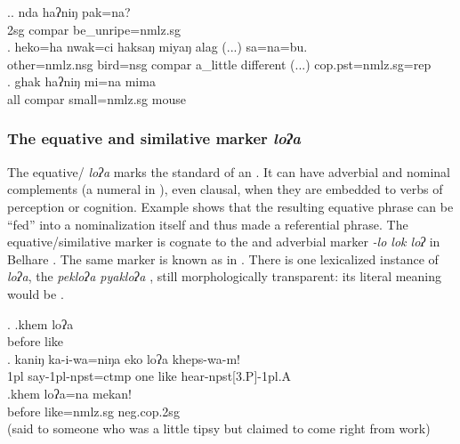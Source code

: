   
\ex.\ag. nda haʔniŋ pak=na?\\
		2{\sc sg}  {\sc compar}	be\_unripe{\sc =nmlz.sg}\\
\bg. heko=ha nwak=ci haksaŋ miyaŋ alag (...) sa=na=bu.\\
	other{\sc =nmlz.nsg} bird{\sc =nsg} {\sc compar}  a\_little different (...) {\sc cop.pst=nmlz.sg=rep}\\
	 
\bg. ghak haʔniŋ mi=na  mima\\
	all {\sc compar} small{\sc =nmlz.sg} mouse\\
 
  

\subsubsection{The equative and similative marker \emph{loʔa}}
  
  The equative/  \emph{loʔa} marks the standard of an . It can have adverbial \Next[a] and nominal  complements  (a numeral in \Next[b]), even clausal, when they are embedded to verbs of perception or cognition. Example \Next[c] shows that the resulting equative phrase  can be “fed”  into a nominalization itself and thus made a referential phrase. The equative/similative marker is cognate to the  and adverbial  marker \emph{-lo \ti lok \ti loʔ} in Belhare  \citep{Bickel1993Belhare}. The same marker is known as  in   \citep{Doornenbal2009A-grammar}.  There is one lexicalized instance of  \emph{loʔa}, the   \emph{pekloʔa \ti pyakloʔa} , still morphologically transparent: its literal meaning would be .
 
 
  \ex. \ag.khem loʔa\\
 before like\\
 \bg. kaniŋ ka-i-wa=niŋa eko loʔa kheps-wa-m!\\
 {\sc 1pl} say{\sc -1pl-npst=ctmp} one like hear{\sc -npst[3.P]-1pl.A}\\
  
  \bg.khem loʔa=na mekan!\\
  before like{\sc =nmlz.sg} {\sc neg.cop.2sg}\\
   (said to someone who was a little tipsy but claimed to come right from work)
  
